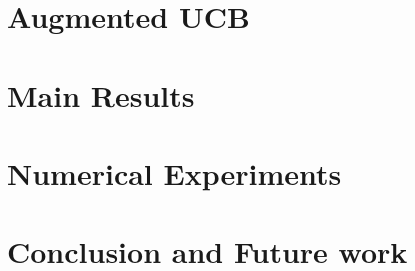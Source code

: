 \documentclass{article}
\begin{document}
\section{Augmented UCB}
\label{algorithm}


\section{Main Results}
\label{results}



\section{Numerical Experiments}
\label{expt}



\section{Conclusion and Future work}
\label{conclusion}



\clearpage
\newpage



%
\end{document}
